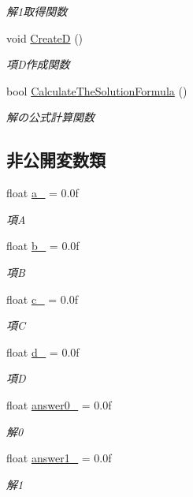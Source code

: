 \begin{DoxyCompactItemize}
\begin{DoxyCompactList}\small\item\em 解1取得関数 \end{DoxyCompactList}\item 
void \mbox{\hyperlink{class_quadratic_equation_a52f73bed0b665bcf3ab827630b999762}{CreateD}} ()
\begin{DoxyCompactList}\small\item\em 項\+D作成関数 \end{DoxyCompactList}\item 
bool \mbox{\hyperlink{class_quadratic_equation_a624a3c6bb7b1cb741cba0b715075e2ed}{Calculate\+The\+Solution\+Formula}} ()
\begin{DoxyCompactList}\small\item\em 解の公式計算関数 \end{DoxyCompactList}\end{DoxyCompactItemize}
\subsection*{非公開変数類}
\begin{DoxyCompactItemize}
\item 
float \mbox{\hyperlink{class_quadratic_equation_ac12480b2ea372fab869fc304dd11a235}{a\+\_\+}} = 0.\+0f
\begin{DoxyCompactList}\small\item\em 項A \end{DoxyCompactList}\item 
float \mbox{\hyperlink{class_quadratic_equation_a874a04dff517be713157e6e97cb5512e}{b\+\_\+}} = 0.\+0f
\begin{DoxyCompactList}\small\item\em 項B \end{DoxyCompactList}\item 
float \mbox{\hyperlink{class_quadratic_equation_a314d9dfa7280b19c190f3e63747c82ae}{c\+\_\+}} = 0.\+0f
\begin{DoxyCompactList}\small\item\em 項C \end{DoxyCompactList}\item 
float \mbox{\hyperlink{class_quadratic_equation_a1fe06575641054bdf707bc2c6321a91d}{d\+\_\+}} = 0.\+0f
\begin{DoxyCompactList}\small\item\em 項D \end{DoxyCompactList}\item 
float \mbox{\hyperlink{class_quadratic_equation_a124202dc6328fc32d2c3e203da5c2c4d}{answer0\+\_\+}} = 0.\+0f
\begin{DoxyCompactList}\small\item\em 解0 \end{DoxyCompactList}\item 
float \mbox{\hyperlink{class_quadratic_equation_a55bdd5d8afc28cc11164132789c4db8c}{answer1\+\_\+}} = 0.\+0f
\begin{DoxyCompactList}\small\item\em 解1 \end{DoxyCompactList}\end{DoxyCompactItemize}


